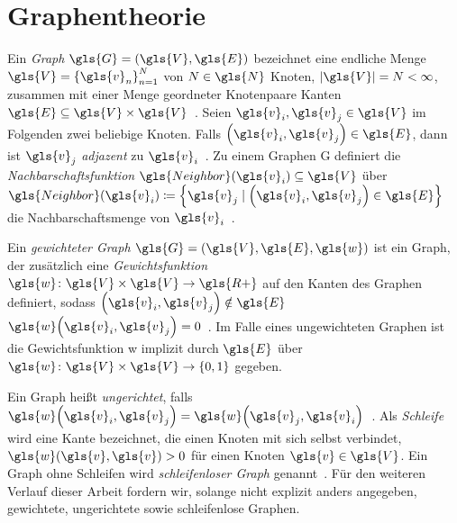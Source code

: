 \section{Graphentheorie}
\label{graphentheorie}

Ein \emph{Graph} $\gls{G} = \left(\gls{V}, \gls{E}\right)$ bezeichnet eine endliche Menge $\gls{V} = {\left\{ \gls{v}_n \right\}}^N_{n=1}$ von $N \in \gls{N}$ Knoten, $\left| \gls{V} \right| = N < \infty$, zusammen mit einer Menge geordneter Knotenpaare \bzw{} Kanten $\gls{E} \subseteq \gls{V} \times \gls{V}$~\cite{Biggs}.
Seien $\gls{v}_i, \gls{v}_j \in \gls{V}$ im Folgenden zwei beliebige Knoten.
Falls $\left( \gls{v}_i, \gls{v}_j \right) \in \gls{E}$, dann ist $\gls{v}_j$ \emph{adjazent} zu $\gls{v}_i$~\cite{Biggs}.
Zu einem Graphen \gls{G} definiert die \emph{Nachbarschaftsfunktion} $\gls{Neighbor}\left(\gls{v}_i\right) \subseteq \gls{V}$ über $\gls{Neighbor}\left(\gls{v}_i\right) \coloneqq \left\{\gls{v}_j \mid \left(\gls{v}_i, \gls{v}_j\right) \in \gls{E}\right\}$ die Nachbarschaftsmenge von $\gls{v}_i$~\cite{Shuman}.

Ein \emph{gewichteter Graph} $\gls{G} = \left(\gls{V}, \gls{E}, \gls{w}\right)$ ist ein Graph, der zusätzlich eine \emph{Gewichtsfunktion} $\gls{w} \colon \gls{V} \times \gls{V} \to \gls{R+}$ auf den Kanten des Graphen definiert, sodass $\left( \gls{v}_i, \gls{v}_j  \right) \notin \gls{E}$ \gdw{} $\gls{w}\left(\gls{v}_i, \gls{v}_j\right) = 0$~\cite{Biggs}.
Im Falle eines ungewichteten Graphen ist die Gewichtsfunktion \gls{w} implizit durch $\gls{E}$ über $\gls{w} \colon \gls{V} \times \gls{V} \to \left\{ 0, 1 \right\}$ gegeben.

Ein Graph heißt \emph{ungerichtet}, falls $\gls{w}\left(\gls{v}_i, \gls{v}_j\right) = \gls{w}\left(\gls{v}_j, \gls{v}_i\right)$~\cite{Biggs}.
Als \emph{Schleife} wird eine Kante bezeichnet, die einen Knoten mit sich selbst verbindet, \dhe{} $\gls{w}\left(\gls{v}, \gls{v}\right) > 0$ für einen Knoten $\gls{v} \in \gls{V}$.
Ein Graph ohne Schleifen wird \emph{schleifenloser Graph} genannt~\cite{Biggs}.
Für den weiteren Verlauf dieser Arbeit fordern wir, solange nicht explizit anders angegeben, gewichtete, ungerichtete sowie schleifenlose Graphen.

